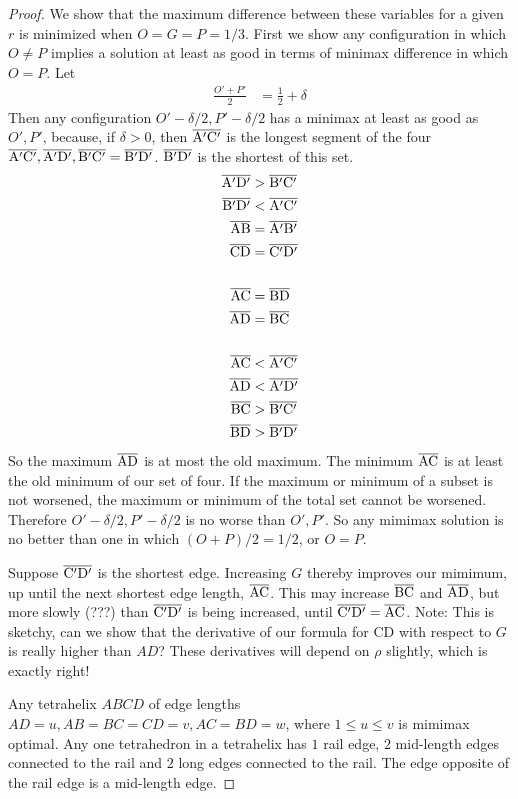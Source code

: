 \documentclass[11pt]{article}
\begin{document}
\begin{proof}
We show that the maximum difference between these variables for a given $r$ is minimized when $O=G=P=1/3$.
First we show any configuration in which $O \neq P$ implies a solution at least as good in terms of minimax difference in which $O = P$.
Let 
\begin{align*}
  \frac{O' + P'}{2} &= \frac{1}{2} + \delta
\end{align*}
Then any configuration $O' - \delta/2, P' - \delta/2$ has a minimax at least as good as $O',P'$, because, if $\delta > 0$, then
$\overline{\rm A'C'}$ is the longest segment of the four $\overline{\rm A'C'}, \overline{\rm A'D'}, \overline{\rm B'C'} =  \overline{\rm B'D'} $.
$\overline{\rm B'D'}$ is the shortest of this set.
\begin{align*}
  \overline{\rm A'D'} &> \overline{\rm B'C'}  \\
   \overline{\rm B'D'} &< \overline{\rm A'C'}  \\  
   \overline{\rm AB} &=   \overline{\rm A'B'}   \\
   \overline{\rm CD} &=   \overline{\rm C'D'}   \\
  \\
    \overline{\rm AC}&=   \overline{\rm BD}   \\
   \overline{\rm AD} &=   \overline{\rm BC}   \\
  \\  
   \overline{\rm AC} &<  \overline{\rm A'C'} \\
   \overline{\rm AD} &< \overline{\rm A'D'}   \\
   \overline{\rm BC} &>  \overline{\rm B'C'} \\
   \overline{\rm BD} &> \overline{\rm B'D'}   \\
\end{align*}
So the maximum $\overline{\rm AD}$ is at most the old maximum. The minimum $\overline{\rm AC}$ is at least the old minimum of our set of four.
If the maximum or minimum of a subset is not worsened, the maximum or minimum of the total set cannot be worsened. Therefore $O' - \delta/2, P' - \delta/2$
is no worse than $O', P'$. So any mimimax solution is no better than one in which $(O + P)/2 = 1/2$, or $O = P$.

Suppose $\overline{\rm C'D'}$ is the shortest edge. Increasing $G$ thereby improves our mimimum, up until the next shortest edge length, $\overline{\rm AC}$.
This may increase $\overline{\rm BC}$ and $\overline{\rm AD}$, but more slowly (???) than $\overline{\rm C'D'}$ is being increased, until  $\overline{\rm C'D'} =
\overline{\rm AC}$.
Note: This is sketchy, can we show that the derivative of our formula for CD  with respect to $G$ is really higher than $AD$? These derivatives will depend on $\rho$ slightly, which is exactly right!

  Any tetrahelix $ABCD$ of edge lengths $AD = u, AB = BC = CD = v , AC = BD = w$, where $1 \leq u \leq v$ is mimimax optimal.
  Any one tetrahedron in a tetrahelix has $1$ rail edge, $2$ mid-length edges connected to the rail and $2$ long edges connected to the rail.
  The edge opposite of the rail edge is a mid-length edge.
    \end{proof}
\end{document}
